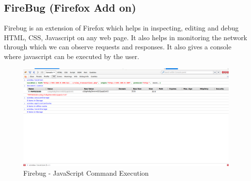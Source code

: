 \subsection{FireBug (Firefox Add on)}
Firebug is an extension of Firefox which helps in inspecting, editing and debug HTML, CSS, Javascript on any web page. It also helps in monitoring the network through which we can observe requests and responses. It also gives a console where javascript can be executed by the user.
\begin{figure}[ht]
	\centering
	\includegraphics[width=.8\linewidth]{figures/tool_firebug.png}
	\caption{Firebug - JavaScript Command Execution}
	\label{fig:tool_firebug}
\end{figure}